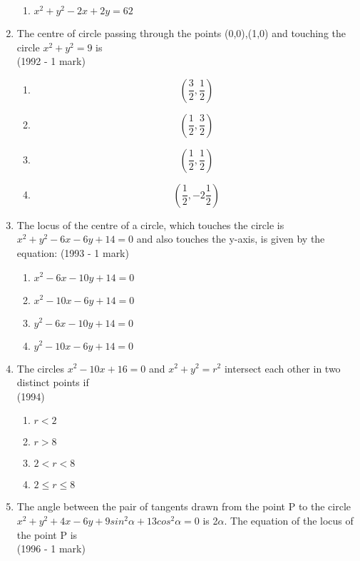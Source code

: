 \documentclass[journal,12pt,twocolumn]{IEEEtran}
\theoremstyle{remark}
\begin{document}
\begin{enumerate}[label=\arabic*.]
\begin{enumerate}[label=(\alph*)]
    \item $x^{2}+y^{2}-2x+2y=62$
    \end{enumerate}
    \item The centre of circle passing through the points (0,0),(1,0) and touching the circle $x^{2}+y^{2}=9$ is\\
    \hspace*{2in} {(1992 - 1 mark)}
    \begin{enumerate}[label=(\alph*)]
    \item \[\left(\frac{3}{2},\frac{1}{2}\right)\]
    \item \[\left(\frac{1}{2},\frac{3}{2}\right)\]
    \item \[\left(\frac{1}{2},\frac{1}{2}\right)\]
    \item \[\left(\frac{1}{2},-2\frac{1}{2}\right)\]
    \end{enumerate}
    \item The locus of the centre of a circle, which touches the circle is $x^{2}+y^{2}-6x-6y+14=0$ and also touches the y-axis, is given by the equation: \hfill {(1993 - 1 mark)}
    \begin{enumerate}[label=(\alph*)]
    \item $x^{2}-6x-10y+14=0$
    \item $x^{2}-10x-6y+14=0$
    \item $y^{2}-6x-10y+14=0$
    \item $y^{2}-10x-6y+14=0$
    \end{enumerate}
    \item The circles $x^{2}-10x+16=0$ and $x^{2}+y^{2}=r^{2}$ intersect each other in two distinct points if \\
    \hspace*{2.7in} {(1994)}
    \begin{enumerate}[label=(\alph*)]
    \item $r<2$
    \item $r>8$
    \item $2<r<8$
    \item $2\leq r\leq8$
    \end{enumerate}
    \item The angle between the pair of tangents drawn from the point P to the circle $x^{2}+y^{2}+4x-6y+9sin^{2}\alpha+13cos^{2}\alpha=0$ is 2$\alpha$. The equation of the locus of the point P is\\
    \hspace*{2in} {(1996 - 1 mark)}
    \begin{enumerate}[label=(\alph*)]

\end{enumerate}
\end{enumerate}
\end{document}
